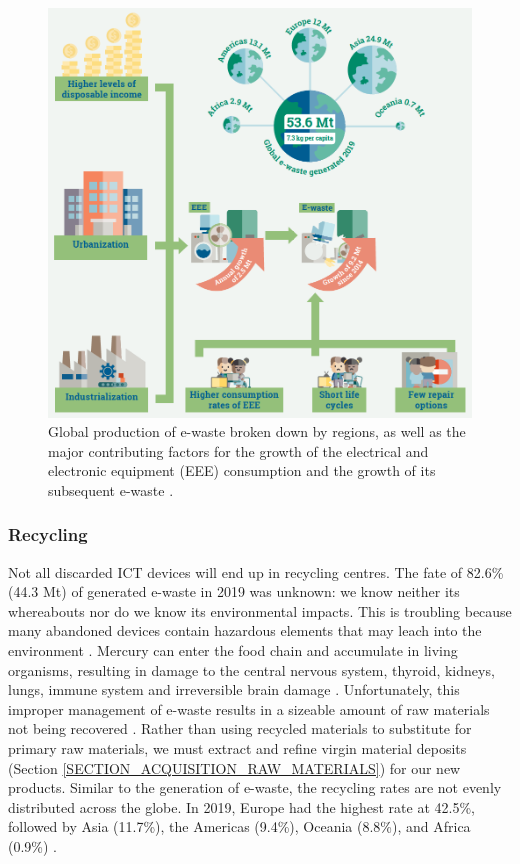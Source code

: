 \documentclass{article}
\begin{document}
\begin{figure}[h]
    \includegraphics[width=.75 \textwidth]{./images/e-waste_global.png}
    \centering
    \caption{Global production of e-waste broken down by regions, as well as the major contributing factors for the growth of the electrical and electronic equipment (EEE) consumption and the growth of its subsequent e-waste \cite{forti2020global}.}
    \label{Global_e_waste_stats}
\end{figure} 
 
\subsubsection{Recycling} \label{SECTION_RECYCLING}
 Not all discarded ICT devices will end up in recycling centres. The fate of 82.6\% (44.3 Mt) of generated e-waste in 2019 was unknown: we know neither its whereabouts nor do we know its environmental impacts. This is troubling because many abandoned devices contain hazardous elements that may leach into the environment \cite{forti2020global}. Mercury can enter the food chain and accumulate in living organisms, resulting in damage to the central nervous system, thyroid, kidneys, lungs, immune system and irreversible brain damage \cite{balde2018waste}. Unfortunately, this improper management of e-waste results in a sizeable amount of raw materials not being recovered \cite{forti2020global}. Rather than using recycled materials to substitute for primary raw materials, we must extract and refine virgin material deposits (Section \ref{SECTION_ACQUISITION_RAW_MATERIALS}) for our new products. Similar to the generation of e-waste, the recycling rates are not evenly distributed across the globe. In 2019, Europe had the highest rate at 42.5\%, followed by Asia (11.7\%), the Americas (9.4\%), Oceania (8.8\%), and Africa (0.9\%) \cite{forti2020global}.
\end{document}
